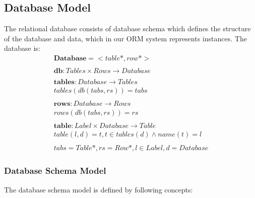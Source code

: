 \documentclass[11pt]{article}
\begin{document}
\subsection{Database Model}
\label{sec:dbModel}
The relational database consists of database schema which defines the structure of the database and data, which in our ORM system represents instances. The database is:
\begin{align*}
	\mathbf{Database} = <table*, row*> \\ \\
	\mathbf{db} : Tables \times Rows \rightarrow Database \\ \\
	\mathbf{tables} : Database \rightarrow Tables \\
	tables(db(tabs, rs)) = tabs \\ \\
	\mathbf{rows} : Database \rightarrow Rows \\
	rows(db(tabs, rs)) = rs \\ \\
	\mathbf{table} : Label \times Database \rightarrow Table  \\
	table(l, d) = t, t \in tables(d) \wedge name(t) = l \\ \\
	tabs = Table*, rs = Row*, l \in Label, d = Database
\end{align*}


\subsubsection{Database Schema Model}
The database schema model is defined by following concepts:
\end{document}
